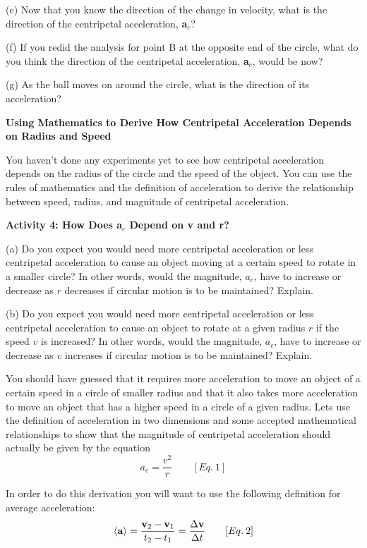 (e) Now that you know the direction of the change in velocity, what is the direction
of the centripetal acceleration, \textbf{a}\( _{c} \)?
\vspace{20mm}

(f) If you redid the analysis for point B at the opposite end of the circle,
what do you think the direction of the centripetal acceleration, \textbf{a}\( _{c} \),
would be now?
\answerspace{20mm}

\pagebreak[2]
(g) As the ball moves on around the circle, what is the direction of its acceleration?
\answerspace{20mm}

\textbf{Using Mathematics to Derive How Centripetal Acceleration Depends on
Radius and Speed }

You haven't done any experiments yet to see how centripetal acceleration depends
on the radius of the circle and the speed of the object. You can use the rules
of mathematics and the definition of acceleration to derive the relationship
between speed, radius, and magnitude of centripetal acceleration. 

\textbf{Activity 4: How Does a\( _{c} \) Depend on v and r?} 

(a) Do you expect you would need more centripetal acceleration or less centripetal
acceleration to cause an object moving at a certain speed to rotate in a smaller
circle? In other words, would the magnitude, \( a_{c} \), have to increase
or decrease as $r$ decreases if circular motion is to be maintained? Explain.
\answerspace{20mm}

(b) Do you expect you would need more centripetal acceleration or less centripetal
acceleration to cause an object to rotate at a given radius $r$ if the speed 
$v$
is increased? In other words, would the magnitude, \( a_{c} \), have to increase
or decrease as $v$ increases if circular motion is to be maintained? Explain.
\answerspace{20mm}

You should have guessed that it requires more acceleration to move an object
of a certain speed in a circle of smaller radius and that it also takes more
acceleration to move an object that has a higher speed in a circle of a given
radius. Lets use the definition of acceleration in two dimensions and some accepted
mathematical relationships to show that the magnitude of centripetal acceleration
should actually be given by the equation
\[
a_{c}=\frac{v^{2}}{r}\qquad [Eq.\: 1]\]


In order to do this derivation you will want to use the following definition
for average acceleration:
\[
\left\langle {\bf a}\right\rangle =\frac{{{\bf v}_{2}}-{{\bf v}_{1}}}
{t_{2}-t_{1}}=\frac{\Delta {\bf v}}{\Delta t}\qquad [Eq.\: 2]\]


